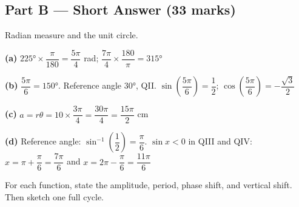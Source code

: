 \documentclass[addpoints]{exam}
\begin{document}
\begin{questions}
\section*{Part B --- Short Answer (33 marks)}

\question Radian measure and the unit circle.
\begin{solution}[9cm]
\textbf{(a)} $\ang{225} \times \dfrac{\pi}{180} = \dfrac{5\pi}{4}$ rad;\quad
$\dfrac{7\pi}{4} \times \dfrac{180}{\pi} = \ang{315}$

\textbf{(b)} $\dfrac{5\pi}{6} = \ang{150}$. Reference angle $\ang{30}$, QII.
$\sin\!\left(\dfrac{5\pi}{6}\right) = \dfrac{1}{2}$;\quad
$\cos\!\left(\dfrac{5\pi}{6}\right) = -\dfrac{\sqrt{3}}{2}$

\textbf{(c)} $a = r\theta = 10 \times \dfrac{3\pi}{4} = \dfrac{30\pi}{4} = \dfrac{15\pi}{2}$ cm

\textbf{(d)} Reference angle: $\sin^{-1}\!\left(\dfrac{1}{2}\right) = \dfrac{\pi}{6}$.
$\sin x < 0$ in QIII and QIV:
$x = \pi + \dfrac{\pi}{6} = \dfrac{7\pi}{6}$ and $x = 2\pi - \dfrac{\pi}{6} = \dfrac{11\pi}{6}$
\end{solution}

\question For each function, state the amplitude, period, phase shift, and vertical
shift. Then sketch one full cycle.
\end{questions}
\end{document}
